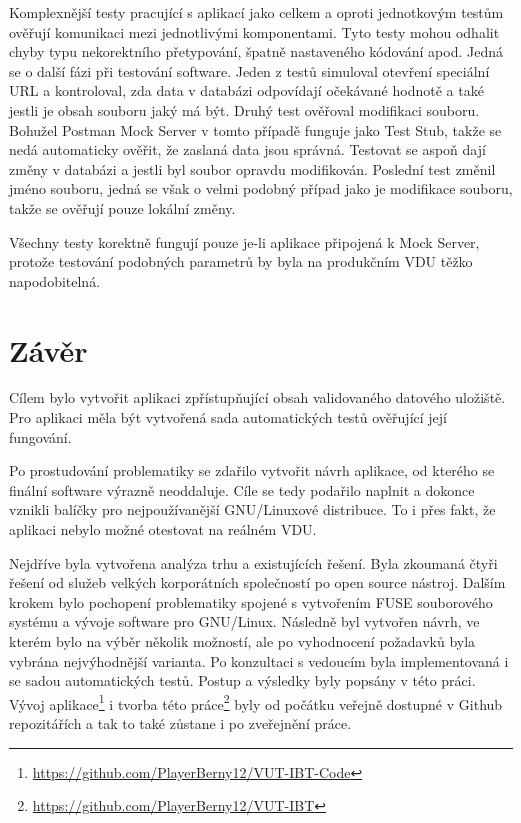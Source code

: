 Komplexnější testy pracující s aplikací jako celkem a oproti jednotkovým testům ověřují komunikaci mezi jednotlivými komponentami. Tyto testy mohou odhalit chyby typu
nekorektního přetypování, špatně nastaveného kódování apod. Jedná se o další fázi při testování software. Jeden z testů simuloval otevření speciální URL a kontroloval,
zda data v databázi odpovídají očekávané hodnotě a také jestli je obsah souboru jaký má být. Druhý test ověřoval modifikaci souboru. Bohužel Postman Mock Server
v tomto případě funguje jako Test Stub, takže se nedá automaticky ověřit, že zaslaná data jsou správná. Testovat se aspoň dají změny v databázi a jestli byl soubor
opravdu modifikován. Poslední test změnil jméno souboru, jedná se však o velmi podobný případ jako je modifikace souboru, takže se ověřují pouze lokální změny.

Všechny testy korektně fungují pouze je-li aplikace připojená k Mock Server, protože testování podobných parametrů by byla na produkčním VDU těžko napodobitelná.

\chapter{Závěr}

Cílem bylo vytvořit aplikaci zpřístupňující obsah validovaného datového uložiště. Pro aplikaci měla být vytvořená sada automatických testů ověřující
její fungování.

Po prostudování problematiky se zdařilo vytvořit návrh aplikace, od kterého se finální software výrazně neoddaluje. Cíle se tedy podařilo naplnit a 
dokonce vznikli balíčky pro nejpoužívanější GNU/Linuxové distribuce. To i přes fakt, že aplikaci nebylo možné otestovat na reálném 
VDU.

Nejdříve byla vytvořena analýza trhu a existujících řešení. Byla zkoumaná čtyři řešení od služeb velkých korporátních společností po open source nástroj.
Dalším krokem bylo pochopení problematiky spojené s vytvořením FUSE souborového systému a vývoje software pro GNU/Linux. Následně byl vytvořen návrh,
ve kterém bylo na výběr několik možností, ale po vyhodnocení požadavků byla vybrána nejvýhodnější varianta. Po konzultaci s vedoucím byla implementovaná
i se sadou automatických testů. Postup a výsledky byly popsány v této práci. Vývoj aplikace\footnote{\url{https://github.com/PlayerBerny12/VUT-IBT-Code}}
i tvorba této práce\footnote{\url{https://github.com/PlayerBerny12/VUT-IBT}} byly od počátku veřejně dostupné v Github repozitářích a tak to také zůstane 
i po zveřejnění práce. 


